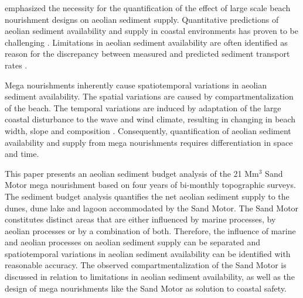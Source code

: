 \citet{Jackson2011} emphasized the necessity for the quantification of
the effect of large scale beach nourishment designs on aeolian
sediment supply. Quantitative predictions of aeolian sediment
availability and supply in coastal environments has proven to be
challenging \citep{Sherman1998, Sherman2012}. Limitations in aeolian
sediment availability are often identified as reason for the
discrepancy between measured and predicted sediment transport rates
\citep{DelgadoFernandez2012, deVries2014b, Lynch2016}.

Mega nourishments inherently cause spatiotemporal variations in
aeolian sediment availability. The spatial variations are caused by
compartmentalization of the beach. The temporal variations are induced
by adaptation of the large coastal disturbance to the wave and wind
climate, resulting in changing in beach width, slope and composition
\citep{deSchipper2016}. Consequently, quantification of aeolian
sediment availability and supply from mega nourishments requires
differentiation in space and time.

This paper presents an aeolian sediment budget analysis of the 21
$\mathrm{Mm^3}$ Sand Motor mega nourishment based on four years of
bi-monthly topographic surveys. The sediment budget analysis
quantifies the net aeolian sediment supply to the dunes, dune lake and
lagoon accommodated by the Sand Motor. The Sand Motor constitutes
distinct areas that are either influenced by marine processes, by
aeolian processes or by a combination of both. Therefore, the
influence of marine and aeolian processes on aeolian sediment supply
can be separated and spatiotemporal variations in aeolian sediment
availability can be identified with reasonable accuracy. The observed
compartmentalization of the Sand Motor is discussed in relation to
limitations in aeolian sediment availability, as well as the design of
mega nourishments like the Sand Motor as solution to coastal safety.



